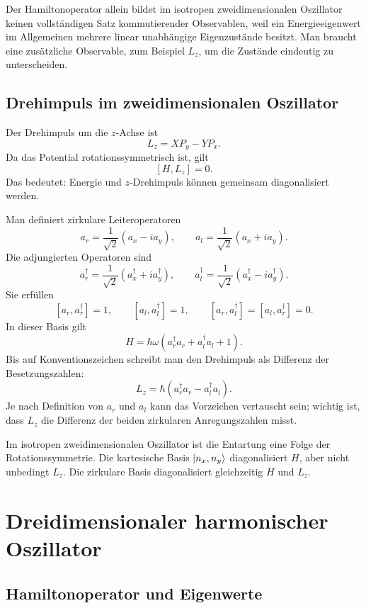 \begin{notebox}
Der Hamiltonoperator allein bildet im isotropen zweidimensionalen Oszillator keinen vollständigen Satz kommutierender Observablen, weil ein Energieeigenwert im Allgemeinen mehrere linear unabhängige Eigenzustände besitzt. Man braucht eine zusätzliche Observable, zum Beispiel $L_z$, um die Zustände eindeutig zu unterscheiden.
\end{notebox}

\subsection{Drehimpuls im zweidimensionalen Oszillator}

Der Drehimpuls um die $z$-Achse ist
\[
    L_z=XP_y-YP_x.
\]
Da das Potential rotationssymmetrisch ist, gilt
\[
    [H,L_z]=0.
\]
Das bedeutet: Energie und $z$-Drehimpuls können gemeinsam diagonalisiert werden.

Man definiert zirkulare Leiteroperatoren
\[
    a_r=\frac{1}{\sqrt2}(a_x-ia_y),
    \qquad
    a_l=\frac{1}{\sqrt2}(a_x+ia_y).
\]
Die adjungierten Operatoren sind
\[
    a_r^\dagger=\frac{1}{\sqrt2}(a_x^\dagger+ia_y^\dagger),
    \qquad
    a_l^\dagger=\frac{1}{\sqrt2}(a_x^\dagger-ia_y^\dagger).
\]
Sie erfüllen
\[
    [a_r,a_r^\dagger]=1,
    \qquad
    [a_l,a_l^\dagger]=1,
    \qquad
    [a_r,a_l^\dagger]=[a_l,a_r^\dagger]=0.
\]
In dieser Basis gilt
\[
    H=\hbar\omega\left(a_r^\dagger a_r+a_l^\dagger a_l+1\right).
\]
Bis auf Konventionszeichen schreibt man den Drehimpuls als Differenz der Besetzungszahlen:
\[
    L_z=\hbar\left(a_r^\dagger a_r-a_l^\dagger a_l\right).
\]
Je nach Definition von $a_r$ und $a_l$ kann das Vorzeichen vertauscht sein; wichtig ist, dass $L_z$ die Differenz der beiden zirkularen Anregungszahlen misst.

\begin{conceptbox}
Im isotropen zweidimensionalen Oszillator ist die Entartung eine Folge der Rotationssymmetrie. Die kartesische Basis $\left|n_x,n_y\right\rangle$ diagonalisiert $H$, aber nicht unbedingt $L_z$. Die zirkulare Basis diagonalisiert gleichzeitig $H$ und $L_z$.
\end{conceptbox}

\section{Dreidimensionaler harmonischer Oszillator}

\subsection{Hamiltonoperator und Eigenwerte}

